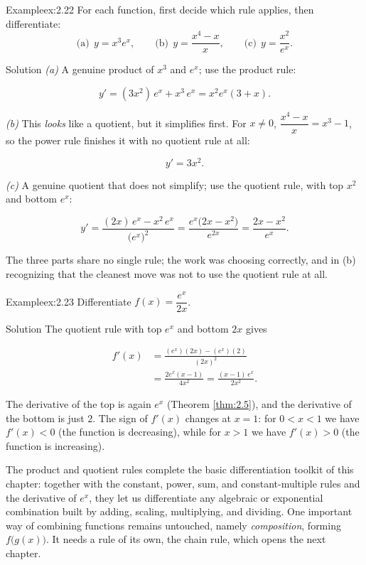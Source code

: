 \documentclass[a4paper,12pt,oneside]{memoir}
\begin{document}
\begin{workedexample}
\begin{envexample}{Example}{ex:2.22}{}
For each function, first decide which rule applies, then differentiate: \[ \text{(a)}\ \ y = x^{3} e^{x}, \qquad \text{(b)}\ \ y = \frac{x^{4} - x}{x}, \qquad \text{(c)}\ \ y = \frac{x^{2}}{e^{x}}. \]
\end{envexample}
\begin{envsolution}{Solution}{}{}
\emph{(a)} A genuine product of \(x^{3}\) and \(e^{x}\); use the product rule:

\[ y' = (3x^{2})\,e^{x} + x^{3}\,e^{x} = x^{2} e^{x}(3 + x). \]

\emph{(b)} This \emph{looks} like a quotient, but it simplifies first. For \(x \ne 0\), \(\dfrac{x^{4} - x}{x} = x^{3} - 1\), so the power rule finishes it with no quotient rule at all:

\[ y' = 3x^{2}. \]

\emph{(c)} A genuine quotient that does not simplify; use the quotient rule, with top \(x^{2}\) and bottom \(e^{x}\):

\[ y' = \frac{(2x)\,e^{x} - x^{2}\,e^{x}}{\bigl(e^{x}\bigr)^{2}} = \frac{e^{x}\bigl(2x - x^{2}\bigr)}{e^{2x}} = \frac{2x - x^{2}}{e^{x}}. \]

The three parts share no single rule; the work was choosing correctly, and in (b) recognizing that the cleanest move was not to use the quotient rule at all.
\end{envsolution}
\end{workedexample}
\begin{workedexample}
\begin{envexample}{Example}{ex:2.23}{}
Differentiate \(f(x) = \dfrac{e^{x}}{2x}\).
\end{envexample}
\begin{envsolution}{Solution}{}{}
The quotient rule with top \(e^{x}\) and bottom \(2x\) gives

\[ \begin{aligned}
          f'(x) &= \frac{(e^{x})(2x) - (e^{x})(2)}{(2x)^{2}} \\[2pt]
                &= \frac{2e^{x}(x - 1)}{4x^{2}}
                 = \frac{(x - 1)\,e^{x}}{2x^{2}}.
        \end{aligned} \]

The derivative of the top is again \(e^{x}\) (Theorem \ref{thm:2.5}), and the derivative of the bottom is just \(2\). The sign of \(f'(x)\) changes at \(x = 1\): for \(0 < x < 1\) we have \(f'(x) < 0\) (the function is decreasing), while for \(x > 1\) we have \(f'(x) > 0\) (the function is increasing).
\end{envsolution}
\end{workedexample}
The product and quotient rules complete the basic differentiation toolkit of this chapter: together with the constant, power, sum, and constant-multiple rules and the derivative of \(e^{x}\), they let us differentiate any algebraic or exponential combination built by adding, scaling, multiplying, and dividing. One important way of combining functions remains untouched, namely \emph{composition}, forming \(f\bigl(g(x)\bigr)\). It needs a rule of its own, the chain rule, which opens the next chapter.
\end{document}
